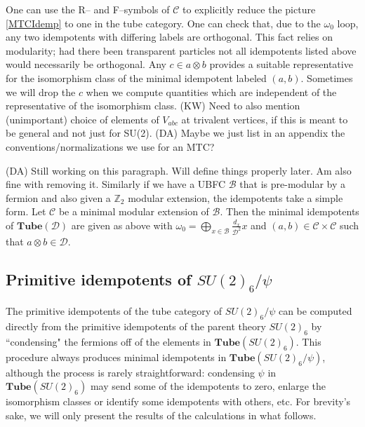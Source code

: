 \documentclass[12pt,a4paper]{article}
\newcommand{\tp}{\otimes}
\newcommand{\mcb}{\mathcal{B}}
\newcommand{\mcd}{\mathcal{D}}
\newcommand{\mcc}{\mathcal{C}}
\newcommand{\zt}{\mathbb{Z}_2}
\newcommand{\tube}{\textbf{Tube}}
\newcommand{\dave}[1]{{\color{ao(english)}\footnotesize{(DA) #1}}}
\newcommand{\ethan}[1]{{\color{amethyst}\footnotesize{(EL) #1}}}
\newcommand{\kw}[1]{{\color{kwcolor}\footnotesize{(KW) #1}}}
\begin{document}
One can use the R-- and F--symbols of $\mcc$ to explicitly reduce the picture \eqref{MTCIdemp} to one in the tube category.
One can check that, due to the $\omega_0$ loop, 
any two idempotents with differing labels are orthogonal. 
This fact relies on modularity; had there been transparent particles not all idempotents listed above would necessarily be orthogonal.
Any $c \in a \tp b$ provides a suitable representative for the isomorphism class of the minimal idempotent labeled $(a,b)$.
Sometimes we will drop the $c$ when we compute quantities which are independent of the representative of the isomorphism class.
\kw{Need to also mention (unimportant) choice of elements of $V_{abc}$ at trivalent vertices, 
if this is meant to be general and not just for SU(2).}
\dave{Maybe we just list in an appendix the conventions/normalizations we use for an MTC?}

\dave{Still working on this paragraph. 
Will define things properly later.
Am also fine with removing it.}
Similarly if we have a UBFC $\mcb$ that is pre-modular by a fermion and also given a $\zt$ modular extension, 
the idempotents take a simple form.  
Let $\mcc$ be a minimal modular extension of $\mcb$.
Then the minimal idempotents of $\tube(\mcd)$ are given as above with $\omega_0 = \bigoplus_{x \in \mcb} \frac{d_x}{\mcd^2} x$ and $(a,b) \in \mcc \times \mcc$ such that $a \tp b \in \mcd$. 
\subsection{Primitive idempotents of $SU(2)_6/\psi$}

The primitive idempotents of the tube category of $SU(2)_6/\psi$ can be computed directly 
from the primitive idempotents of the parent theory $SU(2)_6$ by ``condensing" the fermions off of the elements in $\tube(SU(2)_6)$. 
This procedure always produces minimal idempotents in $\tube(SU(2)_6/\psi)$, 
although the process is rarely straightforward: condensing $\psi$ in $\tube(SU(2)_6)$ 
may send some of the idempotents to zero, enlarge the isomorphism classes or identify some idempotents with others, etc.
For brevity's sake, we will only present the results of the calculations in what follows. 
\end{document}
